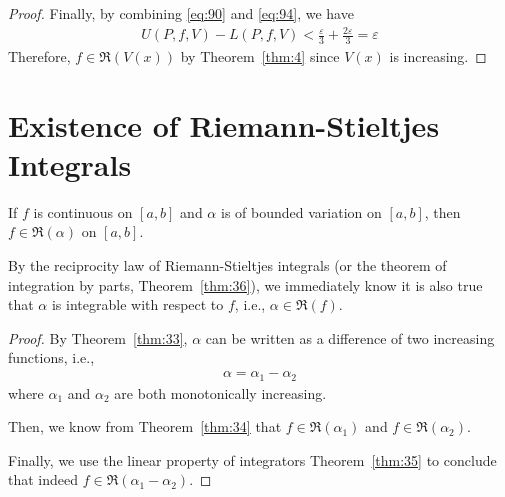 \documentclass[thmcnt=section, 12pt]{elegantbook}
\begin{document}
\begin{proof}
    \par Finally, by combining \eqref{eq:90} and \eqref{eq:94}, we have 
    \begin{align*}
        U(P,f,V) - L(P,f,V)
        < \frac{\varepsilon}{3} + \frac{2\varepsilon}{3}
        = \varepsilon
    \end{align*}
    Therefore, $f \in \mathfrak{R}(V(x))$ by Theorem~\ref{thm:4} since $V(x)$ is increasing.
\end{proof}



\section{Existence of Riemann-Stieltjes Integrals}


\begin{theorem}
    If $f$ is continuous on $[a, b]$ and $\alpha$ is of bounded variation on $[a, b]$, then $f \in \mathfrak{R}(\alpha)$ on $[a, b]$.
\end{theorem}

\begin{remark}
    By the reciprocity law of Riemann-Stieltjes integrals (or the theorem of integration by parts, Theorem~\ref{thm:36}), we immediately know it is also true that $\alpha$ is integrable with respect to $f$, i.e., $\alpha \in \mathfrak{R}(f)$.
\end{remark}

\begin{proof}
    By Theorem~\ref{thm:33}, $\alpha$ can be written as a difference of two increasing functions, i.e., 
    \begin{align*}
        \alpha = \alpha_1 - \alpha_2
    \end{align*}
    where $\alpha_1$ and $\alpha_2$ are both monotonically increasing. 

    \par Then, we know from Theorem~\ref{thm:34} that $f \in \mathfrak{R}(\alpha_1)$ and $f \in \mathfrak{R}(\alpha_2)$.

    \par Finally, we use the linear property of integrators Theorem~\ref{thm:35} to conclude that indeed $f \in \mathfrak{R}(\alpha_1 - \alpha_2)$.
\end{proof}

\end{document}
